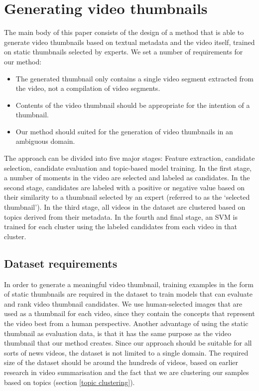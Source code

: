 \documentclass{../resources/sig-alternate-05-2015}
\begin{document}
\section{Generating video thumbnails}
\label{section: system description}
The main body of this paper consists of the design of a method that is able to generate video thumbnails based on textual metadata and the video itself, trained on static thumbnails selected by experts. We set a number of requirements for our method:

\begin{itemize}
	\item The generated thumbnail only contains a single video segment extracted from the video, not a compilation of video segments.
	\item Contents of the video thumbnail should be appropriate for the intention of a thumbnail.
	\item Our method should suited for the generation of video thumbnails in an ambiguous domain.
\end{itemize}

The approach can be divided into five major stages: Feature extraction, candidate selection, candidate evaluation and topic-based model training. In the first stage, a number of moments in the video are selected and labeled as candidates. In the second stage, candidates are labeled with a positive or negative value based on their similarity to a thumbnail selected by an expert (referred to as the `selected thumbnail'). In the third stage, all videos in the dataset are clustered based on topics derived from their metadata. In the fourth and final stage, an SVM is trained for each cluster using the labeled candidates from each video in that cluster.

\subsection{Dataset requirements}
\label{section: dataset requirements}
In order to generate a meaningful video thumbnail, training examples in the form of static thumbnails are required in the dataset to train models that can evaluate and rank video thumbnail candidates. We use human-selected images that are used as a thumbnail for each video, since they contain the concepts that represent the video best from a human perspective. Another advantage of using the static thumbnail as evaluation data, is that it has the same purpose as the video thumbnail that our method creates. Since our approach should be suitable for all sorts of news videos, the dataset is not limited to a single domain. The required size of the dataset should be around the hundreds of videos, based on earlier research in video summarisation \cite{Almeida:2012be,Christel:2004in,Money:2008fn} and the fact that we are clustering our samples based on topics (section \ref{topic clustering}).
\end{document}
